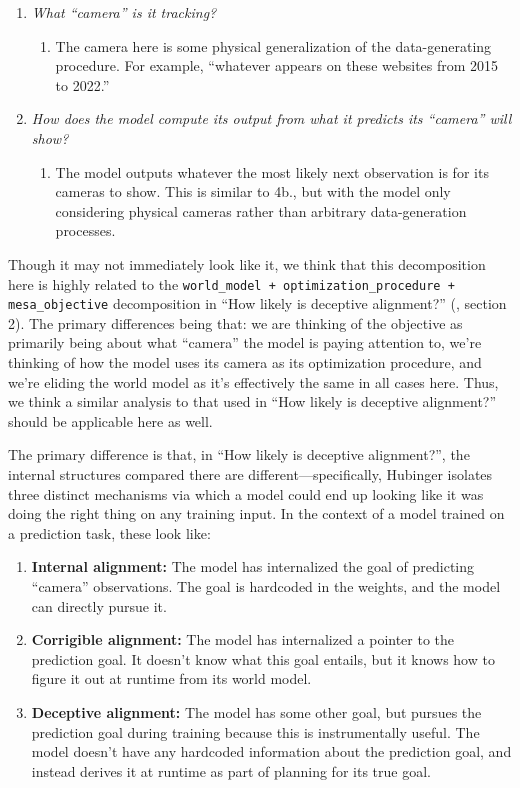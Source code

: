 \documentclass[
  twocolumn,
  natbib,
]{miri-tech-article}
\begin{document}
\begin{enumerate}
    \begin{enumerate}
    \item \textit{What ``camera'' is it tracking?}
        \begin{enumerate}
        \item The camera here is some physical generalization of the data-generating procedure. For example, ``whatever appears on these websites from 2015 to 2022.''
        \end{enumerate}
    \item \textit{How does the model compute its output from what it predicts its ``camera'' will show?}
        \begin{enumerate}
        \item The model outputs whatever the most likely next observation is for its cameras to show. This is similar to 4b., but with the model only considering physical cameras rather than arbitrary data-generation processes.
        \end{enumerate}
    \end{enumerate}
\end{enumerate}

Though it may not immediately look like it, we think that this decomposition here is highly related to the \texttt{world\_model + optimization\_procedure + mesa\_objective} decomposition in ``How likely is deceptive alignment?'' (\cite{how_likely_deception}, section 2). The primary differences being that: we are thinking of the objective as primarily being about what ``camera'' the model is paying attention to, we're thinking of how the model uses its camera as its optimization procedure, and we're eliding the world model as it's effectively the same in all cases here. Thus, we think a similar analysis to that used in ``How likely is deceptive alignment?'' should be applicable here as well.

The primary difference is that, in ``How likely is deceptive alignment?'', the internal structures compared there are different---specifically, Hubinger isolates three distinct mechanisms via which a model could end up looking like it was doing the right thing on any training input. In the context of a model trained on a prediction task, these look like:



\begin{enumerate}
\item \textbf{Internal alignment:} The model has internalized the goal of predicting ``camera'' observations. The goal is hardcoded in the weights, and the model can directly pursue it.
\item \textbf{Corrigible alignment:} The model has internalized a pointer to the prediction goal. It doesn't know what this goal entails, but it knows how to figure it out at runtime from its world model.
\item \textbf{Deceptive alignment:} The model has some other goal, but pursues the prediction goal during training because this is instrumentally useful. The model doesn't have any hardcoded information about the prediction goal, and instead derives it at runtime as part of planning for its true goal.
\end{enumerate}
\end{document}
